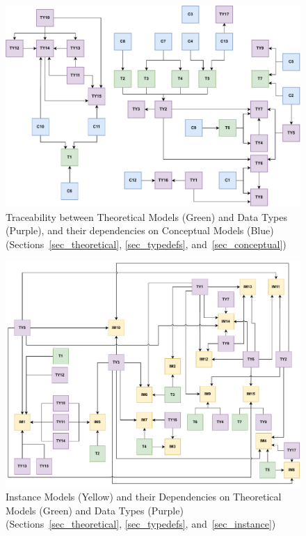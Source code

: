 \begin{landscape}
    \begin{figure}[tbh]
        \centering
        \includegraphics[width=\linewidth]{figures/concept2types_revised.pdf}
        \caption[Traceability between Theoretical Models and Data Types, and
        their dependencies on Conceptual Models]{Traceability between
        Theoretical Models (Green) and Data Types (Purple), and their
        dependencies on Conceptual Models (Blue)
        (Sections~\ref{sec_theoretical}, \ref{sec_typedefs},
        and~\ref{sec_conceptual})}
        \label{fig:C2TY}
    \end{figure}
\end{landscape}

\begin{landscape}
    \begin{figure}[tbh]
        \centering
        \includegraphics[width=0.88\linewidth]{figures/types2instance.pdf}
        \caption[Instance Models and their Dependencies on Theoretical Models
        and Data Types]{Instance Models (Yellow) and their Dependencies on
        Theoretical Models (Green) and Data Types (Purple)
        (Sections~\ref{sec_theoretical}, \ref{sec_typedefs},
        and~\ref{sec_instance})}
        \label{fig:T-TY2IM}
    \end{figure}
\end{landscape}

